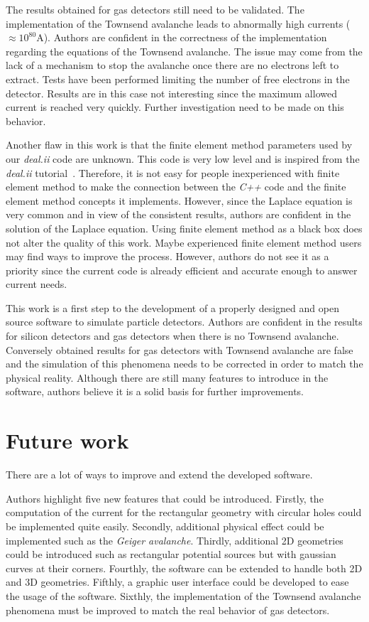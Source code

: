 \documentclass[11pt]{article}
\begin{document}
	The results obtained for gas detectors still need to be validated. The
	implementation of the Townsend avalanche leads to abnormally high currents
	($\approx 10^{80}$A). Authors are confident in the correctness of the implementation
	regarding the equations of the Townsend avalanche. The issue may come from the
	lack of a mechanism to stop the avalanche once there are no electrons left
	to extract. Tests have been performed limiting the number of free electrons in
	the detector. Results are in this case not interesting since the maximum allowed
	current is reached very quickly. Further investigation need to be made on this
	behavior.

	Another flaw in this work is that the finite element method parameters used
	by our \textit{deal.ii} code are unknown. This code is very low level and
	is inspired from the \textit{deal.ii} tutorial~\cite{deal.iituto}.
	Therefore, it is not easy for people inexperienced with finite
	element method to make the connection between the \textit{C++} code and
	the finite element method concepts it implements. However, since
	the Laplace equation is very common and in view of the consistent results,
	authors are confident in the solution of the Laplace equation. Using finite
	element method as a black box does not alter the quality of this work. Maybe
	experienced finite element method users may find ways to improve the process.
	However, authors do not see it as a priority since the current code is already
	efficient and accurate enough to answer current needs.

	This work is a first step to the development of a properly designed and open source
	software to simulate particle detectors. Authors are confident in the results
	for silicon detectors and gas detectors when there is no Townsend avalanche.
	Conversely obtained results for gas detectors with Townsend avalanche are
	false and the simulation of this phenomena needs to be corrected in order
	to match the physical reality.
	 Although there are still
	many features to introduce in the software, authors believe it is a solid
	basis for further improvements.



	\section*{Future work}

		There are a lot of ways to improve and extend the developed software.

		Authors highlight five new features that could be introduced. Firstly, the
		computation of the current for the
		rectangular geometry with circular holes could be implemented quite easily.
		Secondly, additional physical effect
		could be implemented such as the \textit{Geiger avalanche}. Thirdly,
		additional 2D geometries could be introduced such as
		rectangular potential sources but with gaussian curves at their corners.
		Fourthly, the software can be extended to handle both 2D and 3D geometries.
		Fifthly, a graphic user interface could be developed to ease the usage of the
		software. Sixthly, the implementation of the Townsend avalanche phenomena
		must be improved to match the real behavior of gas detectors.
\end{document}
